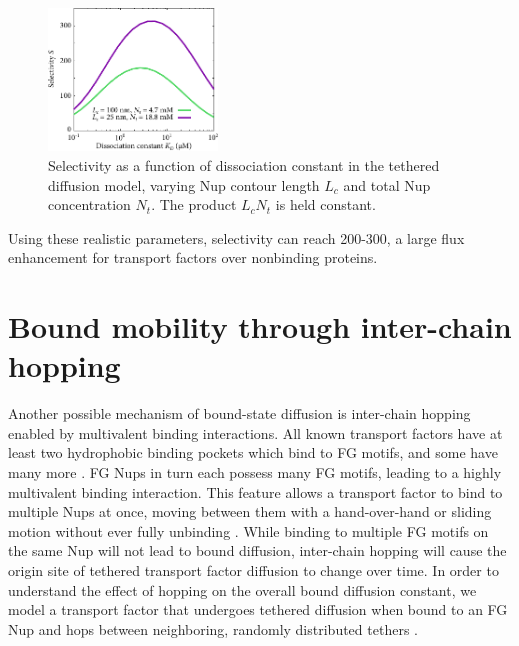 \begin{figure}
\centering
\includegraphics[width=0.4\textwidth]{figs/ch02/chain-comparison.pdf}
\caption[Nup contour length and concentration comparison.]{Selectivity as a function of dissociation
  constant in the tethered diffusion model, varying Nup contour length $L_c$ and total Nup concentration $N_t$.  The product $L_cN_t$ is held constant.}
\label{fig:chainComparison}
\end{figure}

 Using these realistic parameters, selectivity can reach 200-300, a large flux enhancement for transport factors over nonbinding proteins.

\section{Bound mobility through inter-chain hopping}
\label{sec:hopping}

Another possible mechanism of bound-state diffusion is inter-chain hopping enabled by multivalent binding interactions.  All known transport factors have at least two hydrophobic binding pockets which bind to FG motifs, and some have many more \cite{wagner15}.  FG Nups in turn each possess many FG motifs, leading to a highly multivalent binding interaction.  This feature allows a transport factor to bind to multiple Nups at once, moving between them with a hand-over-hand or sliding motion without ever fully unbinding \cite{raveh16, tetenbaum-novatt12}.  While binding to multiple FG motifs on the same Nup will not lead to bound diffusion, inter-chain hopping will cause the origin site of tethered transport factor diffusion to change over time.  In order to understand the effect of hopping on the overall bound diffusion constant, we model a transport factor that undergoes tethered diffusion when bound to an FG Nup and hops between neighboring, randomly distributed tethers .

